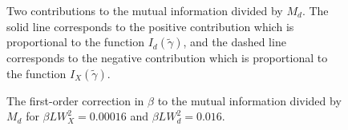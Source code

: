 \documentclass{article}
\begin{document}
\begin{figure}[hbt!]
	\centering
	\caption{Two contributions to the mutual information divided by $M_{d}$. The solid line corresponds to the positive contribution which is proportional to the function $I_{d}(\tilde{\gamma})$, and the dashed line corresponds to the negative contribution which is proportional to the function $I_{X}(\tilde{\gamma})$.} 
	\label{fig:2}
\end{figure}

\begin{figure}[hbt!]
	\centering
	\caption{The first-order correction in $\beta$ to the mutual information divided by $M_{d}$ for $\beta L W_{X}^{2} = 0.00016$ and $\beta L W_{d}^{2} = 0.016$.} 
	\label{fig:2}
\end{figure}
\end{document}
